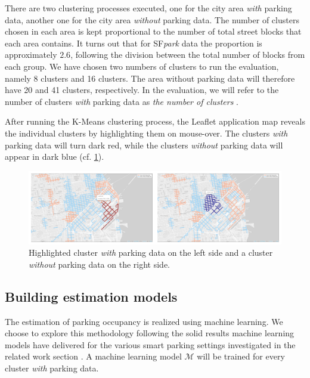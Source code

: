 	There are two clustering processes executed, one for the city area \textit{with} parking data, another one for the city area \textit{without} parking data. The number of clusters chosen in each area is kept proportional to the number of total street blocks that each area contains. It turns out that for SF\textit{park} data the proportion is approximately $2.6$, following the division between the total number of blocks from each group. We have chosen two numbers of clusters to run the evaluation, namely 8 clusters and 16 clusters. The area without parking data will therefore have 20 and 41 clusters, respectively. In the evaluation, we will refer to the number of clusters \textit{with} parking data as \textit{the number of clusters} .	
	
	After running the K-Means clustering process, the Leaflet application map reveals the individual clusters by highlighting them on mouse-over. The clusters \textit{with} parking data will turn dark red, while the clusters \textit{without} parking data will appear in dark blue (cf. \cref{fig:highlighted_collage}). 
	
	\begin{figure}[!ht]
		\centering
		\includegraphics[width=\textwidth]{graphics/highlighted_collage.png}
		\caption{Highlighted cluster \textit{with} parking data on the left side and a cluster \textit{without} parking data on the right side.}
		\label{fig:highlighted_collage}
	\end{figure}
	
	\subsection{Building estimation models}
	The estimation of parking occupancy is realized using machine learning. We choose to explore this methodology following the solid results machine learning models have delivered for the various smart parking settings investigated in the related work section . A machine learning model $\mathcal{M}$ will be trained for every cluster \textit{with} parking data.
	
